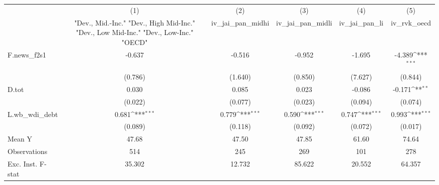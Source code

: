 {
\def\sym#1{\ifmmode^{#1}\else\(^{#1}\)\fi}
\begin{tabular}{l*{5}{c}}
\toprule
            &\multicolumn{1}{c}{(1)}&\multicolumn{1}{c}{(2)}&\multicolumn{1}{c}{(3)}&\multicolumn{1}{c}{(4)}&\multicolumn{1}{c}{(5)}\\
            &\multicolumn{1}{c}{ "Dev., Mid.-Inc." "Dev., High Mid-Inc." "Dev., Low Mid-Inc." "Dev., Low-Inc." "OECD" }&\multicolumn{1}{c}{iv\_jai\_pan\_midhi}&\multicolumn{1}{c}{iv\_jai\_pan\_midli}&\multicolumn{1}{c}{iv\_jai\_pan\_li}&\multicolumn{1}{c}{iv\_rvk\_oecd}\\
\midrule
F.news\_f2s1 &      -0.637         &      -0.516         &      -0.952         &      -1.695         &      -4.389\sym{***}\\
            &     (0.786)         &     (1.640)         &     (0.850)         &     (7.627)         &     (0.844)         \\
\addlinespace
D.tot       &       0.030         &       0.085         &       0.023         &      -0.086         &      -0.171\sym{**} \\
            &     (0.022)         &     (0.077)         &     (0.023)         &     (0.094)         &     (0.074)         \\
\addlinespace
L.wb\_wdi\_debt&       0.681\sym{***}&       0.779\sym{***}&       0.590\sym{***}&       0.747\sym{***}&       0.993\sym{***}\\
            &     (0.089)         &     (0.118)         &     (0.092)         &     (0.072)         &     (0.017)         \\
\midrule
Mean Y      &       47.68         &       47.50         &       47.85         &       61.60         &       74.64         \\
Observations&         514         &         245         &         269         &         101         &         278         \\
Exc. Inst. F-stat&      35.302         &      12.732         &      85.622         &      20.552         &      64.357         \\
\bottomrule
\end{tabular}
}
